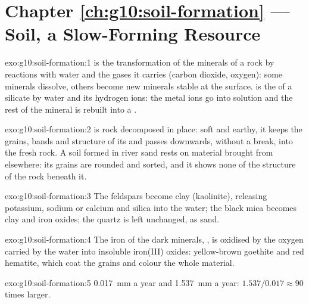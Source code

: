 \section*{Chapter \ref{ch:g10:soil-formation} --- Soil, a Slow-Forming Resource}

\begin{solution}{exo:g10:soil-formation:1}
 is the transformation of the minerals of a rock by
reactions with water and the gases it carries (carbon dioxide, oxygen): some
minerals dissolve, others become new minerals stable at the surface.
 is the  of a silicate by water and its hydrogen
ions: the metal ions go into solution and the rest of the mineral is rebuilt
into a .
\end{solution}

\begin{solution}{exo:g10:soil-formation:2}
 is rock decomposed in place: soft and earthy, it keeps the grains,
bands and structure of its  and passes downwards, without a break,
into the fresh rock. A soil formed in river sand rests on material brought
from elsewhere: its grains are rounded and sorted, and it shows none of the
structure of the rock beneath it.
\end{solution}

\begin{solution}{exo:g10:soil-formation:3}
The feldspars become clay (kaolinite), releasing potassium, sodium or
calcium and silica into the water; the black mica becomes clay and iron
oxides; the quartz is left unchanged, as sand.
\end{solution}

\begin{solution}{exo:g10:soil-formation:4}
The iron of the dark minerals, , is oxidised by the oxygen carried
by the water into insoluble iron(III) oxides: yellow-brown goethite and red
hematite, which coat the grains and colour the whole material.
\end{solution}

\begin{solution}{exo:g10:soil-formation:5}
\qty{0.017}{mm} a year and \qty{1.537}{mm} a year: $1.537/0.017 \approx 90$
times larger.
\end{solution}

